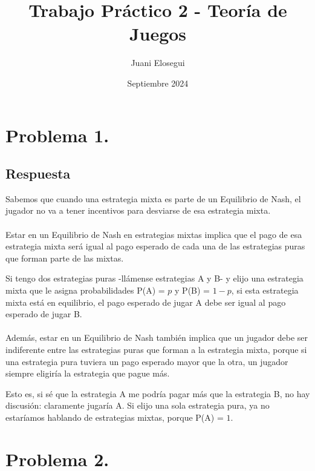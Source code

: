 \documentclass{article}
\title{Trabajo Práctico 2 - Teoría de Juegos}
\author{Juani Elosegui}
\date{Septiembre 2024}
\begin{document}
    \maketitle

    \newpage
    
    \section*{Problema 1.}
        \subsection*{Respuesta}
            Sabemos que cuando una estrategia mixta es parte de un Equilibrio de Nash, el jugador no va a tener incentivos para desviarse de esa estrategia mixta.\\
            \\
            Estar en un Equilibrio de Nash en estrategias mixtas implica que el pago de esa estrategia mixta será igual al pago esperado de cada una de las estrategias puras que forman parte de las mixtas.
            
            Si tengo dos estrategias puras -llámense estrategias A y B- y elijo una estrategia mixta que le asigna probabilidades P(A) = $p$ y P(B) = $1-p$, si esta estrategia mixta está en equilibrio, el pago esperado de jugar A debe ser igual al pago esperado de jugar B.\\
            \\
            Además, estar en un Equilibrio de Nash también implica que un jugador debe ser indiferente entre las estrategias puras que forman a la estrategia mixta, porque si una estrategia pura tuviera un pago esperado mayor que la otra, un jugador siempre eligiría la estrategia que pague más.

            Esto es, si sé que la estrategia A me podría pagar más que la estrategia B, no hay discusión: claramente jugaría A. Si elijo una sola estrategia pura, ya no estaríamos hablando de estrategias mixtas, porque P(A) = $1$.

    \newpage

    \section*{Problema 2.}
\end{document}
